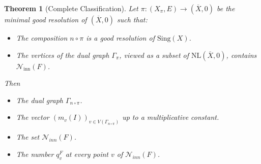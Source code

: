 \documentclass[reqno,dvipsnames,12pt]{amsart}
\newtheorem{thm}{Theorem}[section]
\begin{document}
\begin{thm}[Complete Classification]
Let $\pi : (X_{\pi},E) \longrightarrow (\overline{X},0)$ 
be the minimal good resolution of $(\overline{X},0)$ such that:

\begin{itemize}
    \item The composition $n \circ \pi$ is a good resolution of $\mathrm{Sing}(X)$.
    \item The vertices of the dual graph $\Gamma_{\pi}$, viewed as a subset of $\mathrm{NL}(\overline{X},0)$, contains $\mathcal{N}_{\mathrm{inn}}(F)$.
\end{itemize}

Then  \begin{itemize}
	\item The dual graph $\Gamma_{n \circ \pi }$.
	\item The vector $(m_v(I))_{v \in V(\Gamma_{n \circ \pi} )}$ up to a multiplicative constant.
	\item The set $\mathcal{N}_{inn}(F)$.
	\item The number $q_v^{F}$ at every point $v$ of 	$\mathcal{N}_{inn}(F)$.	\end{itemize}


  
\end{thm} 
\end{document}
